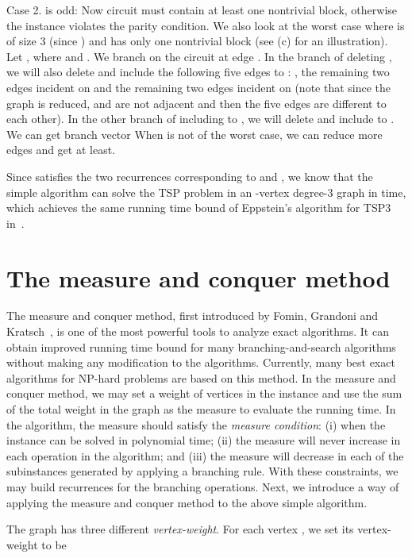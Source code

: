 \documentclass[runningheads]{llncs}
\begin{document}
 Case 2.  is odd: Now circuit  must contain  at least one nontrivial block, otherwise the instance violates the parity condition. We also look at the worst case where  is of size 3 (since ) and   has only one nontrivial block (see (c) for an illustration). Let , where  and .
We branch on the circuit at edge .
In the branch of deleting , we will also delete   and include the following five edges to : , the remaining two edges incident on  and the remaining two edges incident on  (note that since the graph is reduced,  and  are not adjacent and then the five edges are different to each other). In the other branch of including  to , we will delete  and include  to . We can get branch vector
  When  is not of the worst case, we can reduce more edges and get  at least.

 Since  satisfies the two recurrences corresponding to  and , we know that the simple algorithm can solve the TSP problem in an -vertex degree-3 graph in  time, which achieves the same running time bound of Eppstein's algorithm for TSP3 in~\cite{Eppstein:TSP3}.


\section{The measure and conquer method}\label{sec_MaC}
The measure and conquer method, first introduced by  Fomin, Grandoni and Kratsch~\cite{kn:fomin2}, is one of the most powerful tools to analyze exact algorithms.
It can obtain improved running time bound for many branching-and-search algorithms without making any modification to the algorithms. Currently, many best exact algorithms for NP-hard problems are based on this method.
In the measure and conquer method, we may
set a weight of vertices in the instance and use the sum  of the total weight in the graph as the measure
to evaluate the running time. In the algorithm, the measure  should satisfy the \emph{measure condition}: (i) when  the instance can be solved in polynomial time;
(ii) the measure  will never increase in each operation in the algorithm; and (iii) the measure will decrease in each of the subinstances generated by applying a branching rule. With these constraints, we may build recurrences for the branching operations.
Next, we introduce a way of applying the measure and conquer method to the above simple algorithm.

The graph has three different {\em vertex-weight}.
For each vertex , we set its vertex-weight 
to be
\end{document}
